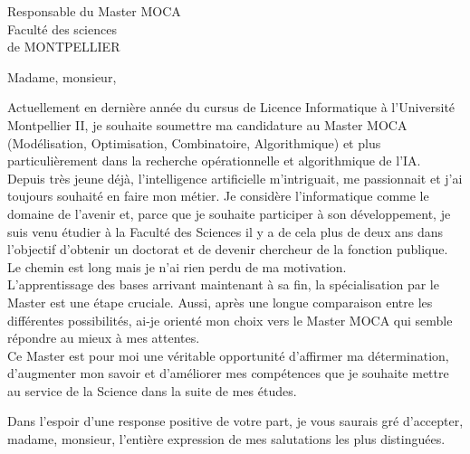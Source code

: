 \documentclass[11pt]{lettre}
\begin{document}
\begin{letter}{Responsable du Master MOCA\\Faculté des sciences\\de MONTPELLIER}
\signature{H.fajraoui}
\address{\centering\textbf{\textsc{FAJRAOUI hadil}}\\570 route de ganges\\34090 MONTPELLIER}
\nofax 

\opening{Madame, monsieur,}

Actuellement en dernière année du cursus de Licence Informatique à l'Université Montpellier II, je souhaite soumettre ma candidature au Master MOCA (Modélisation, Optimisation, Combinatoire, Algorithmique) et plus particulièrement dans la recherche opérationnelle et algorithmique de l'IA.\\
Depuis très jeune déjà, l'intelligence artificielle m'intriguait, me passionnait et  j'ai toujours souhaité en faire mon métier.  Je considère l'informatique comme le domaine de l'avenir et, parce que je souhaite participer à son développement, je suis venu étudier à la Faculté des Sciences il y a de cela plus de deux ans dans l'objectif d'obtenir un doctorat et de devenir chercheur de la fonction publique. Le chemin est long mais je n'ai rien perdu de ma motivation.\\
L'apprentissage des bases arrivant maintenant à sa fin, la spécialisation par le Master est une étape cruciale. Aussi, après une longue comparaison entre les différentes possibilités, ai-je orienté mon choix vers le Master MOCA qui semble répondre au mieux à mes attentes.\\
Ce Master est pour moi une véritable opportunité d'affirmer ma détermination, d'augmenter mon savoir et d'améliorer mes compétences que je souhaite mettre au service de la Science dans la suite de mes études.

\closing{Dans l'espoir d'une response positive de votre part, je vous saurais gré d’accepter, madame, monsieur, l'entière expression de mes salutations les plus distinguées.}

\end{letter}
\end{document}
